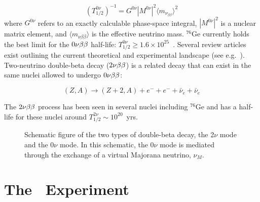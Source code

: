 		\begin{equation}
		\left( T_{1/2}^{0\nu}\right)^{-1} = G^{0\nu} |M^{0\nu}|^2 \langle m_{\nu_{\beta\beta}} \rangle^2  
		\end{equation} 
where $G^{0\nu}$ refers to an exactly calculable phase-space integral, 
$|M^{0\nu}|^2$ is a nuclear matrix element, and $\langle m_{\nu{\beta\beta}}\rangle$
is the effective neutrino mass.  $^{76}$Ge currently holds the best limit for
the $\nonubb$ half-life: $T^{0\nu}_{1/2}\geq 1.6\times10^{25}$~\cite{Bau99}.
Several review articles exist outlining the current theoretical and
experimental landscape (see e.g.~\cite{Ell02,Bara07}).  
Two-neutrino double-beta decay ($\twonubb$) is a related 
decay that can exist in the same nuclei allowed to undergo $\nonubb$:  

		\begin{equation}
		(Z,A) \rightarrow (Z+2,A) + e^- + e^- + \bar{\nu}_e + \bar{\nu}_e
		\end{equation}

The $\twonubb$ process has been seen in several nuclei including $^{76}$Ge and has
a half-life for these nuclei around $T^{2\nu}_{1/2}\sim10^{20}$~yrs.  

		\begin{figure}
			\centering
			\def\figheight{0.38\textheight}
		\caption[Schematic of $\twonubb$ and $\nonubb$ decays.]{Schematic figure of the two types of double-beta decay, 
		the 2$\nu$ mode and the 0$\nu$ mode.  
			In this schematic, the 0$\nu$ mode is mediated through the exchange of a virtual Majorana neutrino, $\nu_{M}$.}
		\label{fig:DBDK}
		\end{figure}
 

	
	\section{The \MJ\ Experiment}
	\label{sec:MJExperiment}
	
